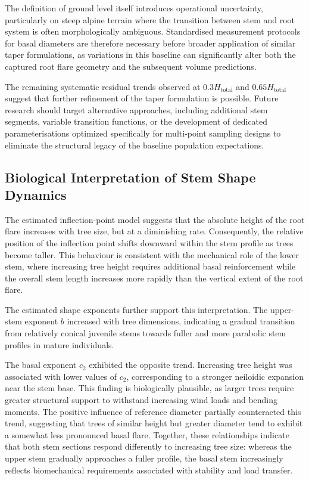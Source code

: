 \documentclass[twocolumn, bibliography=totoc]{scrartcl}
\begin{document}
The definition of ground level itself introduces operational uncertainty, particularly on steep alpine terrain where the transition between stem and root system is often morphologically ambiguous. Standardised measurement protocols for basal diameters are therefore necessary before broader application of similar taper formulations, as variations in this baseline can significantly alter both the captured root flare geometry and the subsequent volume predictions.

The remaining systematic residual trends observed at $0.3H_{\text{total}}$ and $0.65H_{\text{total}}$ suggest that further refinement of the taper formulation is possible. Future research should target alternative approaches, including additional stem segments, variable transition functions, or the development of dedicated parameterisations optimized specifically for multi-point sampling designs to eliminate the structural legacy of the baseline population expectations.

\subsection{Biological Interpretation of Stem Shape Dynamics}

The estimated inflection-point model suggests that the absolute height of the root flare increases with tree size, but at a diminishing rate. Consequently, the relative position of the inflection point shifts downward within the stem profile as trees become taller. This behaviour is consistent with the mechanical role of the lower stem, where increasing tree height requires additional basal reinforcement while the overall stem length increases more rapidly than the vertical extent of the root flare.

The estimated shape exponents further support this interpretation. The upper-stem exponent $b$ increased with tree dimensions, indicating a gradual transition from relatively conical juvenile stems towards fuller and more parabolic stem profiles in mature individuals.

The basal exponent $c_2$ exhibited the opposite trend. Increasing tree height was associated with lower values of $c_2$, corresponding to a stronger neiloidic expansion near the stem base. This finding is biologically plausible, as larger trees require greater structural support to withstand increasing wind loads and bending moments. The positive influence of reference diameter partially counteracted this trend, suggesting that trees of similar height but greater diameter tend to exhibit a somewhat less pronounced basal flare. Together, these relationships indicate that both stem sections respond differently to increasing tree size: whereas the upper stem gradually approaches a fuller profile, the basal stem increasingly reflects biomechanical requirements associated with stability and load transfer.
\end{document}
